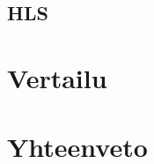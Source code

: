 \documentclass[finnish, 12pt, a4paper, elec, utf8, a-1b, online]{aaltothesis}
\begin{document}
\subsection*{HLS}


\clearpage


\section{Vertailu}


\clearpage

\section{Yhteenveto}


\clearpage


\thesisbibliography
\end{document}
